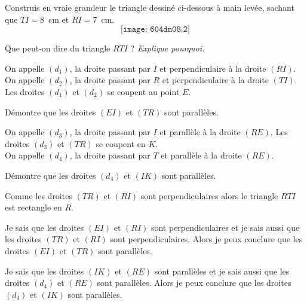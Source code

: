 \begin{myenumerate}
\item Construis en vraie grandeur le triangle dessiné ci-dessous à
  main levée, sachant que $TI=8$~cm et $RI=7$~cm.
\[\texttt{[image: 604dm08.2]}\]
\item Que peut-on dire du triangle $RTI$ ? {\em Explique pourquoi.}
\item On appelle $(d_1)$, la droite passant par $I$ et perpendiculaire
  à la droite $(RI)$.\\On appelle $(d_2)$, la droite passant par $R$
  et perpendiculaire à la droite $(TI)$.\\Les droites $(d_1)$ et
  $(d_2)$ se coupent au point $E$.
\item Démontre que les droites $(EI)$ et $(TR)$ sont parallèles.
\item On appelle $(d_3)$, la droite passant par $I$ et parallèle à la
  droite $(RE)$. Les droites $(d_3)$ et $(TR)$ se coupent en $K$.
  \\On appelle $(d_4)$, la droite passant par $T$ et parallèle à la
  droite $(RE)$.
\item Démontre que les droites $(d_4)$ et $(IK)$ sont parallèles.
\end{myenumerate}
\begin{myenumerate}
  \setcounter{enumi}{1}
\item Comme les droites $(TR)$ et $(RI)$ sont perpendiculaires alors
  le triangle $RTI$ est rectangle en $R$.
  \setcounter{enumi}{3}
\item Je sais que les droites $(EI)$ et $(RI)$ sont perpendiculaires
  et je sais aussi que les droites $(TR)$ et $(RI)$ sont
  perpendiculaires. Alors je peux conclure que les droites $(EI)$ et
  $(TR)$ sont parallèles.
  \setcounter{enumi}{5}
\item Je sais que les droites $(IK)$ et $(RE)$ sont parallèles
  et je sais aussi que les droites $(d_4)$ et $(RE)$ sont
  parallèles. Alors je peux conclure que les droites $(d_4)$ et
  $(IK)$ sont parallèles.
\end{myenumerate}